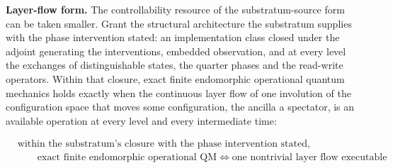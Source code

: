 \documentclass[
]{article}
\begin{document}
\textbf{Layer-flow form.} The controllability resource of the
substratum-source form can be taken smaller. Grant the structural
architecture the substratum supplies with the phase intervention stated:
an implementation class closed under the adjoint generating the
interventions, embedded observation, and at every level the exchanges of
distinguishable states, the quarter phases and the read-write operators.
Within that closure, exact finite endomorphic operational quantum
mechanics holds exactly when the continuous layer flow of one involution
of the configuration space that moves some configuration, the ancilla a
spectator, is an available operation at every level and every
intermediate time:

\[\boxed{\begin{aligned}&\text{within the substratum's closure with the phase intervention stated,}\\ &\qquad \text{exact finite endomorphic operational QM} \;\iff\; \text{one nontrivial layer flow executable}\end{aligned}}\]
\end{document}
